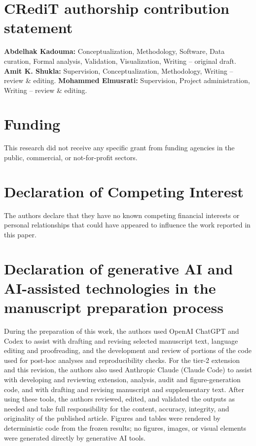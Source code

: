 \documentclass[5p,twocolumn]{elsarticle}
\begin{document}
\section*{CRediT authorship contribution statement}

\textbf{Abdelhak Kadouma:} Conceptualization, Methodology, Software, Data curation, Formal analysis, Validation, Visualization, Writing -- original draft. \textbf{Amit K. Shukla:} Supervision, Conceptualization, Methodology, Writing -- review \& editing. \textbf{Mohammed Elmusrati:} Supervision, Project administration, Writing -- review \& editing.


\section*{Funding}

This research did not receive any specific grant from funding agencies in
the public, commercial, or not-for-profit sectors.

\section*{Declaration of Competing Interest}

The authors declare that they have no known competing financial interests or
personal relationships that could have appeared to influence the work reported
in this paper.

\section*{Declaration of generative AI and AI-assisted technologies in the manuscript preparation process}

During the preparation of this work, the authors used OpenAI ChatGPT and Codex
to assist with drafting and revising selected manuscript text, language editing
and proofreading, and the development and review of portions of the code used
for post-hoc analyses and reproducibility checks. For the tier-2 extension and
this revision, the authors also used Anthropic Claude (Claude Code) to assist
with developing and reviewing extension, analysis, audit and
figure-generation code, and with drafting and revising manuscript and
supplementary text. After using these tools, the
authors reviewed, edited, and validated the outputs as needed and take full
responsibility for the content, accuracy, integrity, and originality of the
published article. Figures and tables were rendered by deterministic code
from the frozen results; no figures, images, or visual elements were
generated directly by generative AI tools.




\end{document}
